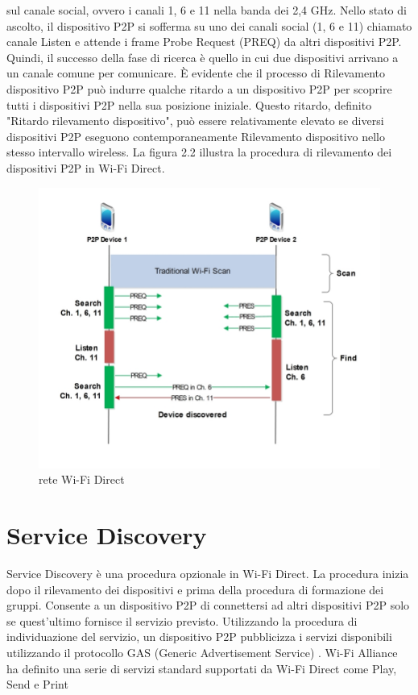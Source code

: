 sul canale social, ovvero i canali 1, 6 e 11 nella banda dei 2,4 GHz.
Nello stato di ascolto, il dispositivo P2P si sofferma su uno dei canali
social (1, 6 e 11) chiamato canale Listen e attende i frame Probe Request
(PREQ) da altri dispositivi P2P. Quindi, il successo della fase di ricerca 
è quello in cui due dispositivi arrivano a un canale comune per comunicare.
È evidente che il processo di Rilevamento dispositivo P2P può indurre 
qualche ritardo a un dispositivo P2P per scoprire tutti i 
dispositivi P2P nella sua posizione iniziale. Questo ritardo, definito 
"Ritardo rilevamento dispositivo", può essere relativamente elevato se 
diversi dispositivi P2P eseguono contemporaneamente Rilevamento dispositivo
nello stesso intervallo wireless. La figura 2.2 illustra la procedura di 
rilevamento dei dispositivi P2P in Wi-Fi Direct.

\begin{figure}
\caption{rete Wi-Fi Direct}
\includegraphics[width=1\columnwidth]{imgs/DeviceDiscovery.jpg} %
\end{figure}


\section{Service Discovery}
Service Discovery è una
procedura opzionale in Wi-Fi Direct. La procedura inizia dopo il 
rilevamento dei dispositivi e prima della procedura di formazione dei 
gruppi. Consente a un dispositivo P2P di connettersi ad altri dispositivi
P2P solo se quest'ultimo fornisce il servizio previsto. Utilizzando la 
procedura di individuazione del servizio, un dispositivo P2P pubblicizza
i servizi disponibili utilizzando il protocollo GAS 
(Generic Advertisement Service) \cite{wikipedia_2015}. 
Wi-Fi Alliance ha definito una serie di servizi standard supportati
da Wi-Fi Direct come Play, Send e Print \cite{wi-fialliance}





